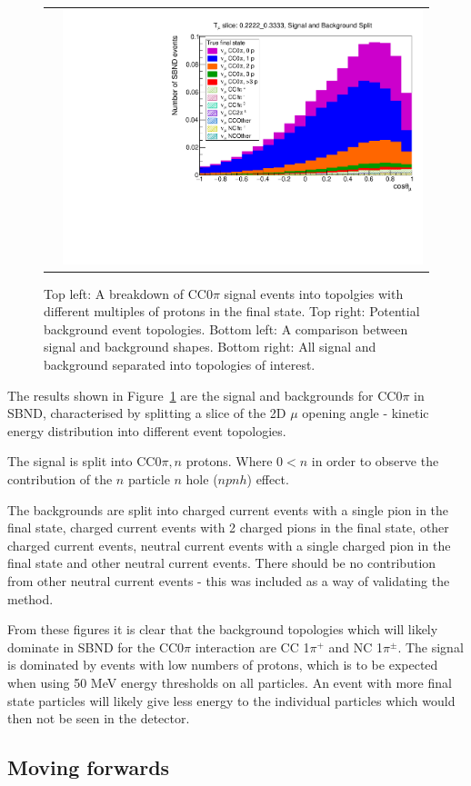 \begin{figure}[h!]
\begin{tabular}{cc}
        &
        \includegraphics[width=.49\textwidth, trim=0 0 0 1.2cm, clip]{images/Split_SBG_Tmu_slice_02222_03333.pdf}
    \end{tabular}
    \caption{Top left: A breakdown of CC0\(\pi\) signal events into topolgies with different multiples of protons in the final state. Top right: Potential background event topologies. Bottom left: A comparison between signal and background shapes. Bottom right: All signal and background separated into topologies of interest.}
    \label{fig:postFSI_Tmu}
\end{figure}

The results shown in Figure~\ref{fig:postFSI_Tmu} are the signal and backgrounds for CC0\(\pi\) in SBND, characterised by splitting a slice of the 2D \(\mu\) opening angle - kinetic energy distribution into different event topologies.

The signal is split into CC0\(\pi, n\) protons. Where \( 0 < n \) in order to observe the contribution of the \( n \) particle \( n \) hole (\( npnh \)) effect. 

The backgrounds are split into charged current events with a single pion in the final state, charged current events with 2 charged pions in the final state, other charged current events, neutral current events with a single charged pion in the final state and other neutral current events. There should be no contribution from other neutral current events - this was included as a way of validating the method. 

From these figures it is clear that the background topologies which will likely dominate in SBND for the CC0\(\pi\) interaction are CC 1\(\pi^{+}\) and NC 1\(\pi^{\pm}\). The signal is dominated by events with low numbers of protons, which is to be expected when using 50 MeV energy thresholds on all particles. An event with more final state particles will likely give less energy to the individual particles which would then not be seen in the detector. 

\subsection{Moving forwards}

